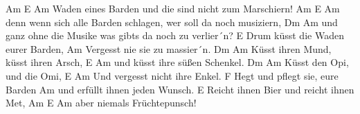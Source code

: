 Am          E                                Am
Waden eines Barden und die sind nicht zum Marschiern!
               Am          E                              Am
denn wenn sich alle Barden schlagen, wer soll da noch musiziern,
         Dm                        Am
und ganz ohne die Musike was gibts da noch zu verlier´n?
               E
Drum küsst die Waden eurer Barden,
                       Am
Vergesst nie sie zu massier´n.
            Dm                Am
Küsst ihren Mund, küsst ihren Arsch,
          E          Am
und küsst ihre süßen Schenkel.
          Dm           Am
Küsst den Opi, und die Omi,
       E                Am
Und vergesst nicht ihre Enkel.
         F
Hegt und pflegt sie, eure Barden
      Am
und erfüllt ihnen jeden Wunsch.
             E
Reicht ihnen Bier und reicht ihnen Met,
             Am   E Am
aber niemals Früchtepunsch!
